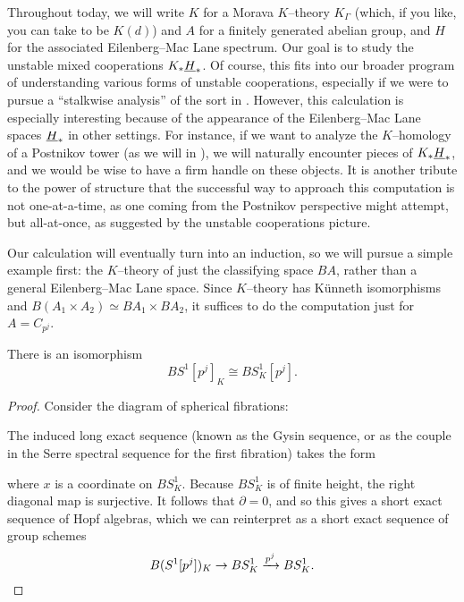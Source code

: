 Throughout today, we will write $K$ for a Morava $K$--theory $K_\Gamma$ (which, if you like, you can take to be $K(d)$) and $A$ for a finitely generated abelian group, and $H$ for the associated Eilenberg--Mac Lane spectrum.  Our goal is to study the unstable mixed cooperations $K_* \underline{\smash{H}}_{*}$.  Of course, this fits into our broader program of understanding various forms of unstable cooperations, especially if we were to pursue a ``stalkwise analysis'' of the sort in .  However, this calculation is especially interesting because of the appearance of the Eilenberg--Mac Lane spaces $\underline{\smash{H}}_{*}$ in other settings.  For instance, if we want to analyze the $K$--homology of a Postnikov tower (as we will in ), we will naturally encounter pieces of $K_* \underline{\smash{H}}_{*}$, and we would be wise to have a firm handle on these objects.  It is another tribute to the power of structure that the successful way to approach this computation is not one-at-a-time, as one coming from the Postnikov perspective might attempt, but all-at-once, as suggested by the unstable cooperations picture.

Our calculation will eventually turn into an induction, so we will pursue a simple example first: the $K$--theory of just the classifying space $BA$, rather than a general Eilenberg--Mac Lane space.  Since $K$--theory has K\"unneth isomorphisms and $B(A_1 \times A_2) \simeq BA_1 \times BA_2$, it suffices to do the computation just for $A = C_{p^j}$.

\begin{theorem}
There is an isomorphism \[BS^1[p^j]_K \cong BS^1_K[p^j].\]
\end{theorem}
\begin{proof}
Consider the diagram of spherical fibrations:
\begin{center}
\end{center}
The induced long exact sequence (known as the Gysin sequence, or as the couple in the Serre spectral sequence for the first fibration) takes the form
\begin{center}
\end{center}
where $x$ is a coordinate on $BS^1_K$.  Because $BS^1_K$ is of finite height, the right diagonal map is surjective.  It follows that $\partial = 0$, and so this gives a short exact sequence of Hopf algebras, which we can reinterpret as a short exact sequence of group schemes \[B(S^1[p^j])_K \to BS^1_K \xrightarrow{p^j} BS^1_K. \qedhere\]
\end{proof}


